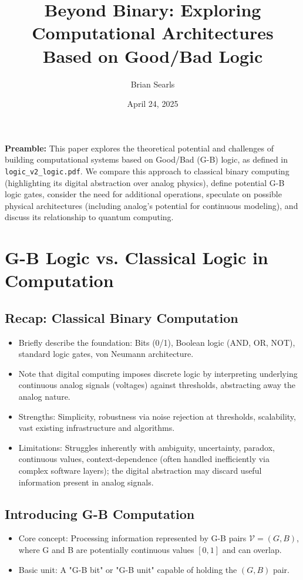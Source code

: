 \documentclass{article}
\title{Beyond Binary: Exploring Computational Architectures Based on Good/Bad Logic}
\author{Brian Searls} %
\date{April 24, 2025} %
\begin{document}
\maketitle

\noindent\textbf{Preamble:} This paper explores the theoretical potential and challenges of building computational systems based on Good/Bad (G-B) logic, as defined in \texttt{logic\_v2\_logic.pdf}. We compare this approach to classical binary computing (highlighting its digital abstraction over analog physics), define potential G-B logic gates, consider the need for additional operations, speculate on possible physical architectures (including analog's potential for continuous modeling), and discuss its relationship to quantum computing.

\vspace{\baselineskip} %

\section{G-B Logic vs. Classical Logic in Computation}

\subsection{Recap: Classical Binary Computation}
\begin{itemize}
    \item Briefly describe the foundation: Bits (0/1), Boolean logic (AND, OR, NOT), standard logic gates, von Neumann architecture.
    \item Note that digital computing imposes discrete logic by interpreting underlying continuous analog signals (voltages) against thresholds, abstracting away the analog nature.
    \item Strengths: Simplicity, robustness via noise rejection at thresholds, scalability, vast existing infrastructure and algorithms.
    \item Limitations: Struggles inherently with ambiguity, uncertainty, paradox, continuous values, context-dependence (often handled inefficiently via complex software layers); the digital abstraction may discard useful information present in analog signals.
\end{itemize}

\subsection{Introducing G-B Computation}
\begin{itemize}
    \item Core concept: Processing information represented by G-B pairs $\mathcal{V} = (G, B)$, where G and B are potentially continuous values $[0,1]$ and can overlap.
    \item Basic unit: A "G-B bit" or "G-B unit" capable of holding the $(G, B)$ pair.
\end{itemize}
\end{document}
